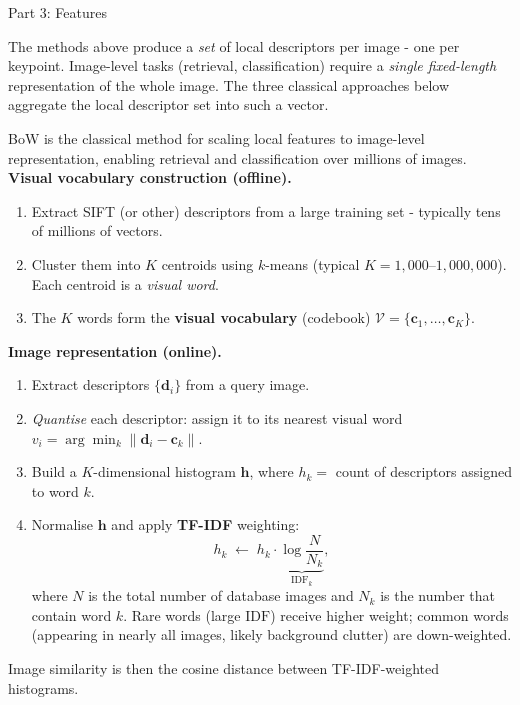 \documentclass[letterpaper]{article}
\begin{document}
\begin{notes}{Part 3: Features}

The methods above produce a \emph{set} of local descriptors per image - one per keypoint. Image-level tasks (retrieval, classification) require a \emph{single fixed-length} representation of the whole image. The three classical approaches below aggregate the local descriptor set into such a vector.


BoW is the classical method for scaling local features to image-level representation, enabling retrieval and classification over millions of images.\\

\textbf{Visual vocabulary construction (offline).}
\begin{enumerate}
    \item Extract SIFT (or other) descriptors from a large training set - typically tens of millions of vectors.
    \item Cluster them into $K$ centroids using $k$-means (typical $K = 1{,}000$–$1{,}000{,}000$). Each centroid is a \emph{visual word}.
    \item The $K$ words form the \textbf{visual vocabulary} (codebook) $\mathcal{V} = \{\mathbf{c}_1,\dots,\mathbf{c}_K\}$.
\end{enumerate}

\textbf{Image representation (online).}
\begin{enumerate}
    \item Extract descriptors $\{\mathbf{d}_i\}$ from a query image.
    \item \emph{Quantise} each descriptor: assign it to its nearest visual word $v_i = \arg\min_k \|\mathbf{d}_i - \mathbf{c}_k\|$.
    \item Build a $K$-dimensional histogram $\mathbf{h}$, where $h_k = $ count of descriptors assigned to word $k$.
    \item Normalise $\mathbf{h}$ and apply \textbf{TF-IDF} weighting:
    $$h_k \;\leftarrow\; h_k \cdot \underbrace{\log\frac{N}{N_k}}_{\mathrm{IDF}_k},$$
    where $N$ is the total number of database images and $N_k$ is the number that contain word $k$. Rare words (large $\mathrm{IDF}$) receive higher weight; common words (appearing in nearly all images, likely background clutter) are down-weighted.
\end{enumerate}
Image similarity is then the cosine distance between TF-IDF-weighted histograms.\\


\end{notes}
\end{document}
